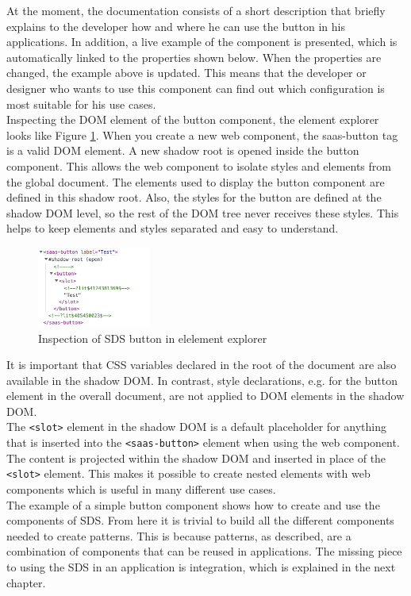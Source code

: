 At the moment, the documentation consists of a short description that briefly explains to the developer how and where he can use the button in his applications. In addition, a live example of the component is presented, which is automatically linked to the properties shown below. When the properties are changed, the example above is updated. This means that the developer or designer who wants to use this component can find out which configuration is most suitable for his use cases. \\
Inspecting the \ac{DOM} element of the button component, the element explorer looks like Figure \ref{button_element_explorer}. When you create a new web component, the saas-button tag is a valid \ac{DOM} element. A new shadow root is opened inside the button component. This allows the web component to isolate styles and elements from the global document. The elements used to display the button component are defined in this shadow root. Also, the styles for the button are defined at the shadow \ac{DOM} level, so the rest of the \ac{DOM} tree never receives these styles. This helps to keep elements and styles separated and easy to understand. \\
\begin{figure}[htbp]
    \centerline{\includegraphics[height=100px]{images/button_element_explorer.png}}
    \caption{Inspection of \ac{SDS} button in elelement explorer}
    \label{button_element_explorer}
\end{figure}
It is important that \ac{CSS} variables declared in the root of the document are also available in the shadow \ac{DOM}. In contrast, style declarations, e.g. for the button element in the overall document, are not applied to \ac{DOM} elements in the shadow \ac{DOM}. \\
The \texttt{<slot>} element in the shadow \ac{DOM} is a default placeholder for anything that is inserted into the \texttt{<saas-button>} element when using the web component. The content is projected within the shadow \ac{DOM} and inserted in place of the \texttt{<slot>} element. This makes it possible to create nested elements with web components which is useful in many different use cases. \\

The example of a simple button component shows how to create and use the components of \ac{SDS}. From here it is trivial to build all the different components needed to create patterns. This is because patterns, as described, are a combination of components that can be reused in applications. The missing piece to using the \ac{SDS} in an application is integration, which is explained in the next chapter.